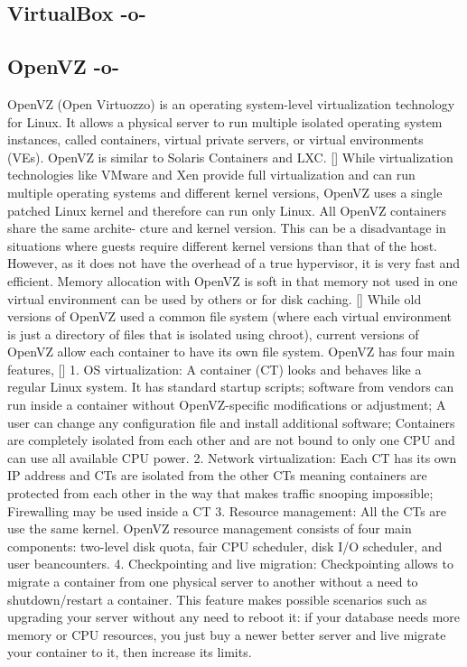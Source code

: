 \subsection{VirtualBox -o-}



\subsection{OpenVZ -o-}

OpenVZ (Open Virtuozzo) is an operating system-level virtualization
technology for Linux. It allows a physical server to run multiple
isolated operating system instances, called containers, virtual
private servers, or virtual environments (VEs). OpenVZ is similar to
Solaris Containers and LXC. [\cite{www-openvz-3}] While virtualization
technologies like VMware and Xen provide full virtualization and can
run multiple operating systems and different kernel versions, OpenVZ
uses a single patched Linux kernel and therefore can run only
Linux. All OpenVZ containers share the same archite- cture and kernel
version. This can be a disadvantage in situations where guests require
different kernel versions than that of the host. However, as it does
not have the overhead of a true hypervisor, it is very fast and
efficient. Memory allocation with OpenVZ is soft in that memory not
used in one virtual environment can be used by others or for disk
caching. [\cite{www-openvz-2}] While old versions of OpenVZ used a
common file system (where each virtual environment is just a directory
of files that is isolated using chroot), current versions of OpenVZ
allow each container to have its own file system.  OpenVZ has four
main features, [\cite{www-openvz-1}] 1. OS virtualization: A container
(CT) looks and behaves like a regular Linux system. It has standard
startup scripts; software from vendors can run inside a container
without OpenVZ-specific modifications or adjustment; A user can change
any configuration file and install additional software; Containers are
completely isolated from each other and are not bound to only one CPU
and can use all available CPU power.  2. Network virtualization: Each
CT has its own IP address and CTs are isolated from the other CTs
meaning containers are protected from each other in the way that makes
traffic snooping impossible; Firewalling may be used inside a CT
3. Resource management: All the CTs are use the same kernel. OpenVZ
resource management consists of four main components: two-level disk
quota, fair CPU scheduler, disk I/O scheduler, and user beancounters.
4. Checkpointing and live migration: Checkpointing allows to migrate a
container from one physical server to another without a need to
shutdown/restart a container. This feature makes possible scenarios
such as upgrading your server without any need to reboot it: if your
database needs more memory or CPU resources, you just buy a newer
better server and live migrate your container to it, then increase its
limits.


